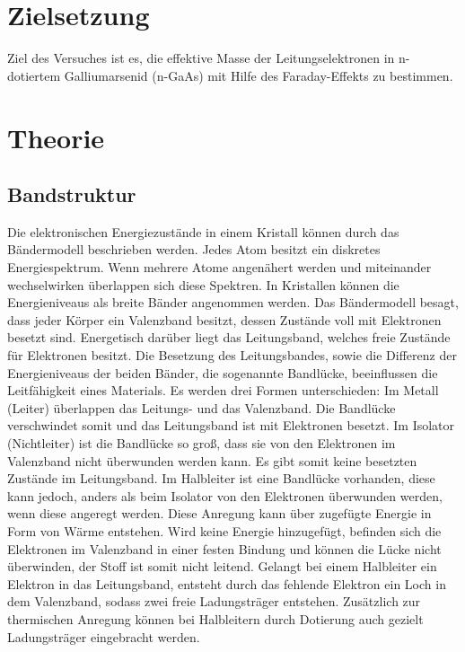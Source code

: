\section{Zielsetzung}
\label{sec:Zielsetzung}

Ziel des Versuches ist es, die effektive Masse der Leitungselektronen in n-dotiertem Galliumarsenid (n-GaAs)
mit Hilfe des Faraday-Effekts zu bestimmen.

\section{Theorie}
\label{sec:Theorie}

\subsection{Bandstruktur}
\label{sub:Bandstruktur}
Die elektronischen Energiezustände in einem Kristall können durch das Bändermodell beschrieben werden.
Jedes Atom besitzt ein diskretes Energiespektrum. Wenn mehrere Atome angenähert werden und miteinander
wechselwirken überlappen sich diese Spektren. In Kristallen können die Energieniveaus als breite Bänder angenommen werden.
Das Bändermodell besagt, dass jeder Körper ein Valenzband besitzt, dessen Zustände voll mit Elektronen besetzt sind.
Energetisch darüber liegt das Leitungsband, welches freie Zustände für Elektronen besitzt.
Die Besetzung des Leitungsbandes, sowie die Differenz der Energieniveaus der beiden Bänder, die sogenannte Bandlücke,
beeinflussen die Leitfähigkeit eines Materials.
Es werden drei Formen unterschieden:
Im Metall (Leiter) überlappen das Leitungs- und das Valenzband. Die Bandlücke verschwindet somit und das Leitungsband ist mit Elektronen besetzt.
Im Isolator (Nichtleiter) ist die Bandlücke so groß, dass sie von den Elektronen im Valenzband nicht überwunden werden kann. Es gibt somit keine
besetzten Zustände im Leitungsband.
Im Halbleiter ist eine Bandlücke vorhanden, diese kann jedoch, anders als beim Isolator von den Elektronen überwunden werden, wenn diese angeregt werden.
Diese Anregung kann über zugefügte Energie in Form von Wärme entstehen.
Wird keine Energie hinzugefügt, befinden sich die Elektronen im Valenzband in einer festen Bindung und können die Lücke
nicht überwinden, der Stoff ist somit nicht leitend.
Gelangt bei einem Halbleiter ein Elektron in das Leitungsband, entsteht durch das fehlende Elektron ein Loch in dem Valenzband, sodass zwei freie 
Ladungsträger entstehen.
Zusätzlich zur thermischen Anregung können bei Halbleitern durch Dotierung auch gezielt Ladungsträger eingebracht werden.


